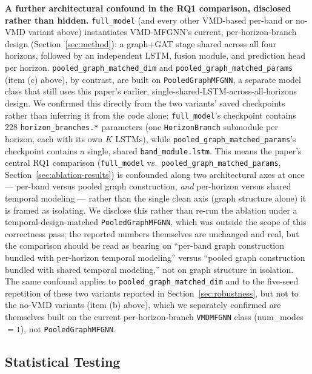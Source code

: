 \documentclass[journal]{IEEEtran}
\begin{document}
\textbf{A further architectural confound in the RQ1 comparison, disclosed rather than hidden.} \texttt{full\_model} (and every other VMD-based per-band or no-VMD variant above) instantiates VMD-MFGNN's current, per-horizon-branch design (Section~\ref{sec:method}): a graph+GAT stage shared across all four horizons, followed by an independent LSTM, fusion module, and prediction head per horizon. \texttt{pooled\_graph\_matched\_dim} and \texttt{pooled\_graph\_matched\_params} (item (c) above), by contrast, are built on \texttt{PooledGraphMFGNN}, a separate model class that still uses this paper's earlier, single-shared-LSTM-across-all-horizons design. We confirmed this directly from the two variants' saved checkpoints rather than inferring it from the code alone: \texttt{full\_model}'s checkpoint contains 228 \texttt{horizon\_branches.*} parameters (one \texttt{HorizonBranch} submodule per horizon, each with its own $K$ LSTMs), while \texttt{pooled\_graph\_matched\_params}'s checkpoint contains a single, shared \texttt{band\_module.lstm}. This means the paper's central RQ1 comparison (\texttt{full\_model} vs.\ \texttt{pooled\_graph\_matched\_params}, Section~\ref{sec:ablation-results}) is confounded along two architectural axes at once --- per-band versus pooled graph construction, \emph{and} per-horizon versus shared temporal modeling --- rather than the single clean axis (graph structure alone) it is framed as isolating. We disclose this rather than re-run the ablation under a temporal-design-matched \texttt{PooledGraphMFGNN}, which was outside the scope of this correctness pass; the reported numbers themselves are unchanged and real, but the comparison should be read as bearing on ``per-band graph construction bundled with per-horizon temporal modeling'' versus ``pooled graph construction bundled with shared temporal modeling,'' not on graph structure in isolation. The same confound applies to \texttt{pooled\_graph\_matched\_dim} and to the five-seed repetition of these two variants reported in Section~\ref{sec:robustness}, but not to the no-VMD variants (item (b) above), which we separately confirmed are themselves built on the current per-horizon-branch \texttt{VMDMFGNN} class (num\_modes$=1$), not \texttt{PooledGraphMFGNN}.

\subsection{Statistical Testing}
\end{document}
